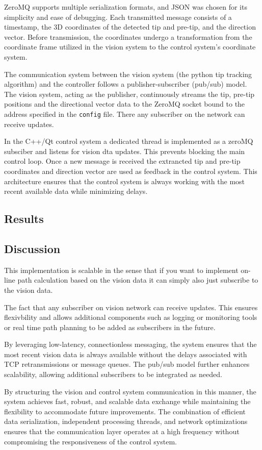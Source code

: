
ZeroMQ supports multiple serialization formats, and JSON was chosen for its simplicity and ease of debugging. Each transmitted message consists of a timestamp, the 3D coordinates of the detected tip and pre-tip, and the direction vector. Before transmission, the coordinates undergo a transformation from the coordinate frame utilized in the vision system to the control system's coordinate system. 

The communication system between the vision system (the python tip tracking algorithm) and the controller follows a publisher-subscriber (pub/sub) model. The vision system, acting as the publisher, continuously streams the tip, pre-tip positions and the directional vector data to the ZeroMQ socket bound to the address specified in the \texttt{config} file. There any subscriber on the network can receive updates. 

In the C++/Qt control system a dedicated thread is implemented as a zeroMQ subsciber and listens for vision dta updates. This prevents blocking the main control loop. Once a new message is received the extrancted tip and pre-tip coordinates and direction vector are used as feedback in the control system. This architecture ensures that the control system is always working with the most recent available data while minimizing delays.

\subsection{Results}

\subsection{Discussion}
This implementation is scalable in the sense that if you want to implement on-line path calculation based on the vision data it can simply also just subscribe to the vision data.

The fact that any subscriber on vision network can receive updates. This ensures flexivbility and allows additional components such as logging or monitoring tools or real time path planning to be added as subscribers in the future.

By leveraging low-latency, connectionless messaging, the system ensures that the most recent vision data is always available without the delays associated with TCP retransmissions or message queues. The pub/sub model further enhances scalability, allowing additional subscribers to be integrated as needed.

By structuring the vision and control system communication in this manner, the system achieves fast, robust, and scalable data exchange while maintaining the flexibility to accommodate future improvements. The combination of efficient data serialization, independent processing threads, and network optimizations ensures that the communication layer operates at a high frequency without compromising the responsiveness of the control system. 


